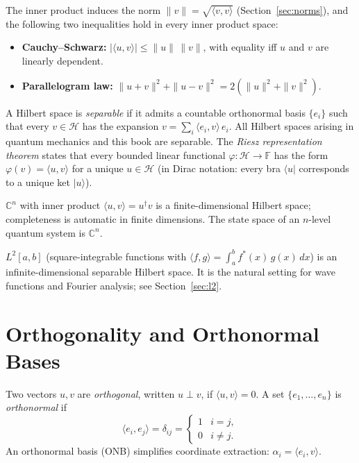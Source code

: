 The inner product induces the norm $\|v\|=\sqrt{\langle v,v\rangle}$ (Section~\ref{sec:norms}), and the following two inequalities hold in every inner product space:
\begin{itemize}
  \item \textbf{Cauchy--Schwarz:} $|\langle u,v\rangle|\le\|u\|\,\|v\|$, with equality iff $u$ and $v$ are linearly dependent.
  \item \textbf{Parallelogram law:} $\|u+v\|^2+\|u-v\|^2 = 2(\|u\|^2+\|v\|^2)$.
\end{itemize}

A Hilbert space is \emph{separable} if it admits a countable orthonormal basis $\{e_i\}$ such that every $v\in\mathcal{H}$ has the expansion $v=\sum_i\langle e_i,v\rangle\,e_i$. All Hilbert spaces arising in quantum mechanics and this book are separable. The \emph{Riesz representation theorem} states that every bounded linear functional $\varphi:\mathcal{H}\to\mathbb{F}$ has the form $\varphi(v)=\langle u,v\rangle$ for a unique $u\in\mathcal{H}$ (in Dirac notation: every bra $\langle u|$ corresponds to a unique ket $|u\rangle$).

\begin{example}
$\mathbb{C}^n$ with inner product $\langle u,v\rangle=u^\dagger v$ is a finite-dimensional Hilbert space; completeness is automatic in finite dimensions. The state space of an $n$-level quantum system is $\mathbb{C}^n$.
\end{example}

\begin{example}
$L^2[a,b]$ (square-integrable functions with $\langle f,g\rangle=\int_a^b f^*(x)\,g(x)\,dx$) is an infinite-dimensional separable Hilbert space. It is the natural setting for wave functions and Fourier analysis; see Section~\ref{sec:l2}.
\end{example}

\section{Orthogonality and Orthonormal Bases}

Two vectors $u,v$ are \emph{orthogonal}, written $u\perp v$, if $\langle u,v\rangle=0$. A set $\{e_1,\ldots,e_n\}$ is \emph{orthonormal} if
\[
  \langle e_i, e_j\rangle = \delta_{ij} = \begin{cases}1 & i=j,\\ 0 & i\neq j.\end{cases}
\]
An orthonormal basis (ONB) simplifies coordinate extraction: $\alpha_i = \langle e_i, v\rangle$.

